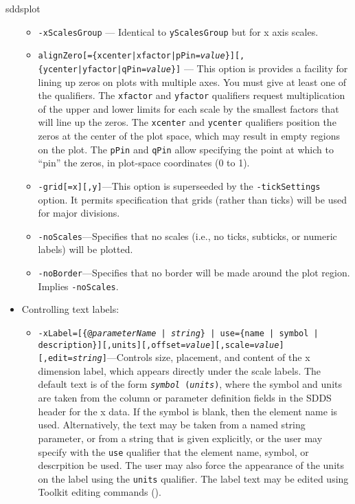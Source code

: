 \begin{sddsprog}{sddsplot}
\begin{itemize}
\begin{itemize}
  \item {\tt -xScalesGroup} --- Identical to \verb|yScalesGroup| but for x axis scales.

  \item {\tt alignZero[=\{xcenter|xfactor|pPin={\em value}\}][,\{ycenter|yfactor|qPin={\em value}\}]} ---
  This option is provides a facility for lining up zeros on plots with multiple axes.  You must give
at least one of the qualifiers.  The {\tt xfactor} and {\tt yfactor} qualifiers request multiplication
of the upper and lower limits for each scale by the smallest factors that will line up the zeros.
The {\tt xcenter} and {\tt ycenter} qualifiers position the zeros at the center of the plot space,
which may result in empty regions on the plot.  The {\tt pPin} and {\tt qPin} allow specifying the
point at which to ``pin'' the zeros, in plot-space coordinates (0 to 1).

  \item {\tt -grid[=x][,y]}---This option is superseeded by the {\tt -tickSettings} option.  It permits specification
that grids (rather than ticks) will be used for major divisions.

  \item {\tt -noScales}---Specifies that no scales (i.e., no ticks, subticks, or numeric labels) will be plotted.

  \item {\tt -noBorder}---Specifies that no border will be made around the plot region.  Implies {\tt -noScales}.

  \end{itemize}
\item Controlling text labels:
  \begin{itemize}

  \item {\tt -xLabel=[\{@{\em parameterName} | {\em string}\} | use=\{name | symbol |
description\}][,units][,offset={\em value}][,scale={\em value}][,edit={\em string}]}---Controls size,
placement, and content of the x dimension label, which appears directly under the scale labels.  The
default text is of the form {\tt {\em symbol} ({\em units})}, where the symbol and units are taken from
the column or parameter definition fields in the SDDS header for the x data.  If the symbol is blank, then
the element name is used.  Alternatively, the text may be taken from a named string parameter, or from a
string that is given explicitly, or the user may specify with the {\tt use} qualifier that the
element name, symbol, or descrpition be used.  The user may also force the appearance of the units on the
label using the {\tt units} qualifier.   The label text may be edited using Toolkit editing commands
().


\end{itemize}
\end{itemize}
\end{sddsprog}
